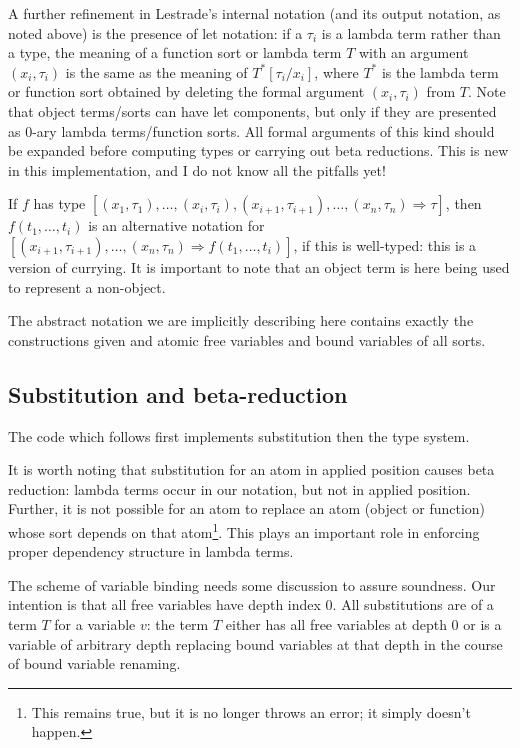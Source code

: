 \documentclass[12pt]{article}
\begin{document}
A further refinement in Lestrade's internal notation (and its output notation, as noted above) is the presence of let notation:  if a $\tau_i$ is a lambda term rather than a type, the meaning of a function sort or lambda term $T$ with an argument $(x_i,\tau_i)$ is
the same as the meaning of $T^*[\tau_i/x_i]$, where $T^*$ is the lambda term or function sort obtained by deleting the formal argument $(x_i,\tau_i)$ from $T$.  Note that object
terms/sorts  can have let components, but only if they are presented as 0-ary lambda terms/function sorts.  All formal arguments of this kind should be expanded before computing types
or carrying out beta reductions.  This is new in this implementation, and I do not know all the pitfalls yet!

If $f$ has type $[(x_1,\tau_1),\ldots,(x_i,\tau_i),(x_{i+1},\tau_{i+1}),\ldots,(x_n,\tau_n)\Rightarrow \tau]$, then $f(t_1,\ldots,t_i)$ is an alternative notation for $[(x_{i+1},\tau_{i+1}),\ldots,(x_n,\tau_n)\Rightarrow f(t_1,\ldots,t_i)]$, if this is well-typed:  this is a version of currying.  It is important to note that an object term is here being used to represent a non-object.

The abstract notation we are implicitly describing here contains exactly the constructions given and atomic free variables and bound variables of all sorts.

\subsection{Substitution and beta-reduction}

The code which follows first implements substitution then the type system.

It is worth noting that substitution for an atom in applied position causes beta reduction:  lambda terms occur in our notation, but not in applied position.  Further, it is not possible
for an atom to replace an atom (object or function) whose sort depends on that atom\footnote{This remains true, but it is no longer throws an error;  it simply doesn't happen.}.  This plays an important role in enforcing proper dependency structure in lambda terms.

The scheme of variable binding needs some discussion to assure soundness.  Our intention is that
all free variables have depth index 0.  All substitutions are of a term $T$ for a variable $v$:
the term $T$ either has all free variables at depth 0 or is a variable of arbitrary depth replacing bound variables at that depth in the course of bound variable renaming.
\end{document}
